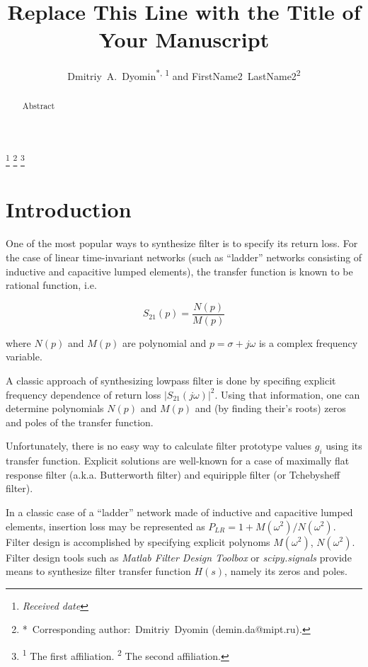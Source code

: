 \documentclass{pj}
\begin{document}
\setcounter{page}{1}

\title
{Replace This Line with the Title of Your Manuscript}
\footnote{\it Received date}
\footnote{\hskip-0.12in*\, Corresponding author:~Dmitriy~Dyomin (demin.da@mipt.ru).}
\footnote{\hskip-0.12in\textsuperscript{1} The first affiliation. \textsuperscript{2} The second affiliation.}

\author{Dmitriy~A.~Dyomin\textsuperscript{*, 1} and FirstName2~LastName2\textsuperscript{2}}



\begin{abstract}
  Abstract
\end{abstract}
\section{Introduction}
\label{sec:introduction}

One of the most popular ways to synthesize filter is to specify its
return loss. For the case of linear time-invariant networks (such as
``ladder'' networks consisting of inductive and capacitive lumped
elements), the transfer function is known to be rational function,
i.e.

\[
  S_{21}(p) = \frac{N(p)}{M(p)}
\]

where $N(p)$ and $M(p)$ are polynomial and $p = \sigma + j \omega$ is
a complex frequency variable.

A classic approach of synthesizing lowpass filter is done by specifing
explicit frequency dependence of return loss
$\left|S_{21}(j\omega)\right|^2$. Using that information, one can
determine polynomials $N(p)$ and $M(p)$ and (by finding their's roots)
zeros and poles of the transfer function.

Unfortunately, there is no easy way to calculate filter prototype
values $g_i$ using its transfer function. Explicit solutions are
well-known for a case of maximally flat response filter
(a.k.a. Butterworth filter) and equiripple filter (or Tchebysheff
filter).



In a classic case of a ``ladder'' network made of
inductive and capacitive lumped elements, insertion loss may be
represented as $P_{LR} = 1 + M(\omega^2)/N(\omega^2)$. Filter design
is accomplished by specifying explicit polynoms $M(\omega^2)$,
$N(\omega^2)$. Filter design tools such as {\em Matlab Filter Design
  Toolbox} or {\em scipy.signals} provide means to synthesize filter
transfer function $H(s)$, namely its zeros and poles.
\end{document}
